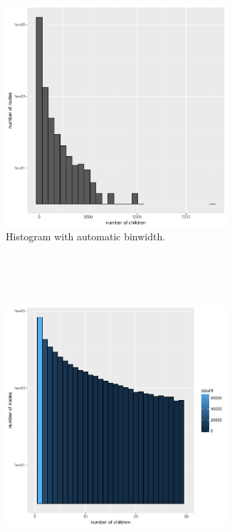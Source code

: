     \begin{figure}[h!]
      \centering
      \begin{subfigure}[b]{0.5\textwidth}
        \includegraphics[width=0.9\textwidth]{Figures/multifurc.pdf}
        \caption{Histogram with automatic binwidth. \\ ~ \\ ~}
      \end{subfigure}
      ~~~ %
      \begin{subfigure}[b]{0.42\textwidth}
        \includegraphics[trim = 0mm 0mm 30mm 0mm, clip, width=0.9\textwidth]{Figures/multifurc_small.pdf}

\end{subfigure}
\end{figure}

